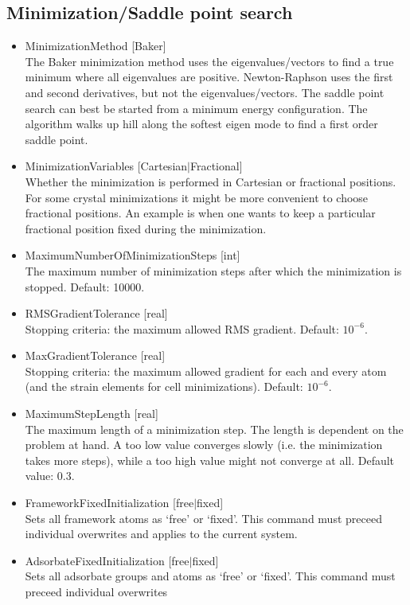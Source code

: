 \subsection*{Minimization/Saddle point search}
\begin{itemize}
\item{MinimizationMethod [Baker]}\\
The Baker minimization method uses the eigenvalues/vectors to find a true minimum where all eigenvalues are positive. Newton-Raphson
uses the first and second derivatives, but not the eigenvalues/vectors.
The saddle point search can best be started from a minimum energy configuration. The algorithm walks up hill along the softest eigen mode
to find a first order saddle point.
\item{MinimizationVariables [Cartesian$|$Fractional]}\\
Whether the minimization is performed in Cartesian or fractional positions. For some crystal minimizations it might be more convenient
to choose fractional positions. An example is when one wants to keep a particular fractional position fixed during the minimization.
\item{MaximumNumberOfMinimizationSteps [int]}\\
The maximum number of minimization steps after which the minimization is stopped. Default: 10000.
\item{RMSGradientTolerance [real]}\\
Stopping criteria: the maximum allowed RMS gradient. Default: $10^{-6}$.
\item{MaxGradientTolerance [real]}\\
Stopping criteria: the maximum allowed gradient for each and every atom (and the strain elements for cell minimizations). Default: $10^{-6}$.
\item{MaximumStepLength [real]}\\
The maximum length of a minimization step. The length is dependent on the problem at hand.
A too low value converges slowly (i.e. the minimization takes more steps),
while a too high value might not converge at all. Default value: 0.3.
\item{FrameworkFixedInitialization [free$|$fixed]}\\
Sets all framework atoms as `free' or `fixed'. This command must preceed individual overwrites
and applies to the current system.
\item{AdsorbateFixedInitialization [free$|$fixed]}\\
Sets all adsorbate groups and atoms as `free' or `fixed'. This command must preceed individual overwrites

\end{itemize}
